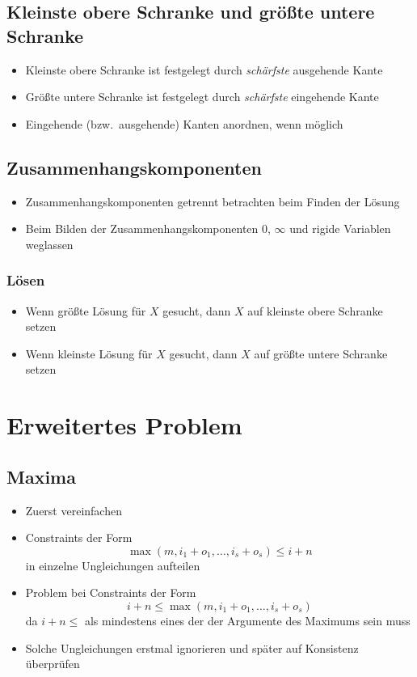\documentclass[hyperref={pdfpagelabels=false}]{beamer}
\begin{document}
\subsection{Kleinste obere Schranke und größte untere Schranke}
\begin{frame}
	\begin{itemize}
		\item Kleinste obere Schranke ist festgelegt durch \emph{schärfste} ausgehende Kante
		\item Größte untere Schranke ist festgelegt durch \emph{schärfste} eingehende Kante
		\item Eingehende (bzw.\ ausgehende) Kanten anordnen, wenn möglich
	\end{itemize}
\end{frame}
\subsection{Zusammenhangskomponenten}
\begin{frame}
	\begin{itemize}
		\item Zusammenhangskomponenten getrennt betrachten beim Finden der Lösung
		\item Beim Bilden der Zusammenhangskomponenten $0$, $\infty$ und rigide Variablen weglassen
	\end{itemize}
\end{frame}
\begin{frame}
	\frametitle{Lösen}
	\begin{itemize}
		\item Wenn größte Lösung für $X$ gesucht, dann $X$ auf kleinste obere Schranke setzen
		\item Wenn kleinste Lösung für $X$ gesucht, dann $X$ auf größte untere Schranke setzen
	\end{itemize}
\end{frame}
\section{Erweitertes Problem}
\label{ext}
\subsection{Maxima}
\begin{frame}
	\begin{itemize}
		\item Zuerst vereinfachen
		\item Constraints der Form
			\[ \max(m,i_1+o_1,\dotsc,i_s+o_s) \leq i + n \]
			in einzelne Ungleichungen aufteilen
		\item Problem bei Constraints der Form
			\[ i + n \leq \max(m,i_1+o_1,\dotsc,i_s+o_s) \]
			da $i+n \leq$ als mindestens eines der der Argumente des Maximums sein muss %
		\item Solche Ungleichungen erstmal ignorieren und später auf Konsistenz überprüfen %
	\end{itemize}
\end{frame}
\end{document}
